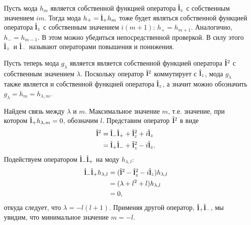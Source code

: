 \documentclass[12pt,a4paper]{article}
\begin{document}
        Пусть мода $h_m$ является собственной функцией оператора $\hat{\mathbf{l}}_z$ с собственным значением $i m$. Тогда мода $h_{+} = \hat{\mathbf{l}}_{+} h_m$ тоже будет являться собственной функцией оператора $\hat{\mathbf{l}}_z$ с собственным значением $i (m + 1)$: $h_{+} = h_{m + 1}$. Аналогично, $h_{-} = h_{m - 1}$. В этом можно убедиться непосредственной проверкой. В силу этого $\hat{\mathbf{l}}_{+}$ и $\hat{\mathbf{l}}_{-}$ называют операторами повышения и понижения.

        Пусть теперь мода $g_\lambda$ является является собственной функцией оператора $\hat{\mathbf{l}}^2$ с собственным значением $\lambda$. Поскольку оператор $\hat{\mathbf{l}}^2$ коммутирует с $\hat{\mathbf{l}}_z$, мода $g_\lambda$ также является и собственной функцией оператора $\hat{\mathbf{l}}_z$, а значит можно обозначить $g_\lambda = h_m = h_{\lambda,m}$.

        Найдем связь между $\lambda$ и $m$. Максимальное значение $m$, т.е. значение, при котором $\hat{\mathbf{l}}_{+} h_{\lambda,m} = 0$, обозначим $l$. Представим оператор $\hat{\mathbf{l}}^2$ в виде
        \begin{equation}\begin{aligned}
            \hat{\mathbf{l}}^2
                &= \hat{\mathbf{l}}_{-}\hat{\mathbf{l}}_{+} + \hat{\mathbf{l}}^2_{z} + i \hat{\mathbf{l}}_{z} \\
                &= \hat{\mathbf{l}}_{+}\hat{\mathbf{l}}_{-} + \hat{\mathbf{l}}^2_{z} - i \hat{\mathbf{l}}_{z} .
        \end{aligned}\end{equation}
        Подействуем оператором $\hat{\mathbf{l}}_{-}\hat{\mathbf{l}}_{+}$ на моду $h_{\lambda,l}$:
        \begin{equation}\begin{aligned}
            \hat{\mathbf{l}}_{-}\hat{\mathbf{l}}_{+} h_{\lambda,l}
                &= (\hat{\mathbf{l}}^2 - \hat{\mathbf{l}}^2_{z} - i \hat{\mathbf{l}}_{z}) h_{\lambda,l} \\
                &= (\lambda + l^2 + l) h_{\lambda,l} \\
                &= 0 ,
        \end{aligned}\end{equation}
        откуда следует, что $\lambda = - l (l + 1)$. Применяя другой оператор, $\hat{\mathbf{l}}_{+}\hat{\mathbf{l}}_{-}$, мы увидим, что минимальное значение $m = - l$.


    \nocite{*}
    
    
\end{document}
